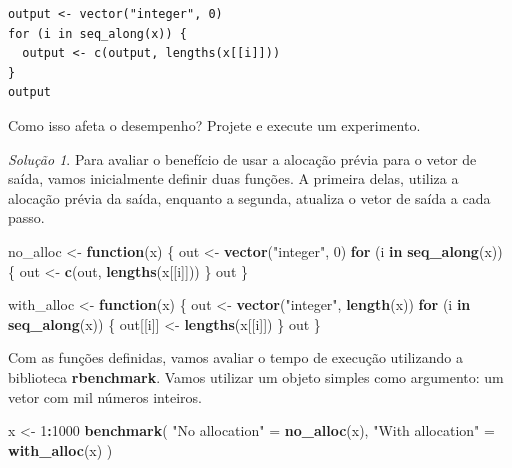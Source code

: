 \documentclass[
]{latex/krantz}
\newenvironment{Shaded}{\begin{snugshade}}{\end{snugshade}}
\newcommand{\ControlFlowTok}[1]{\textcolor[rgb]{0.13,0.29,0.53}{\textbf{#1}}}
\newcommand{\DecValTok}[1]{\textcolor[rgb]{0.00,0.00,0.81}{#1}}
\newcommand{\FunctionTok}[1]{\textcolor[rgb]{0.13,0.29,0.53}{\textbf{#1}}}
\newcommand{\NormalTok}[1]{#1}
\newcommand{\OtherTok}[1]{\textcolor[rgb]{0.56,0.35,0.01}{#1}}
\newcommand{\SpecialCharTok}[1]{\textcolor[rgb]{0.81,0.36,0.00}{\textbf{#1}}}
\newcommand{\StringTok}[1]{\textcolor[rgb]{0.31,0.60,0.02}{#1}}
\theoremstyle{definition}
\theoremstyle{definition}
\theoremstyle{definition}
\theoremstyle{definition}
\theoremstyle{remark}
\newtheorem*{solution}{Solução}
\begin{document}
\begin{verbatim}
output <- vector("integer", 0)
for (i in seq_along(x)) {
  output <- c(output, lengths(x[[i]]))
}
output
\end{verbatim}

Como isso afeta o desempenho? Projete e execute um experimento.

\begin{solution}
Para avaliar o benefício de usar a alocação prévia para o vetor de saída, vamos inicialmente definir duas funções. A primeira delas, utiliza a alocação prévia da saída, enquanto a segunda, atualiza o vetor de saída a cada passo.

\begin{Shaded}
\begin{Highlighting}[]
\NormalTok{no\_alloc }\OtherTok{\textless{}{-}} \ControlFlowTok{function}\NormalTok{(x) \{}
\NormalTok{  out }\OtherTok{\textless{}{-}} \FunctionTok{vector}\NormalTok{(}\StringTok{"integer"}\NormalTok{, }\DecValTok{0}\NormalTok{)}
  \ControlFlowTok{for}\NormalTok{ (i }\ControlFlowTok{in} \FunctionTok{seq\_along}\NormalTok{(x)) \{}
\NormalTok{    out }\OtherTok{\textless{}{-}} \FunctionTok{c}\NormalTok{(out, }\FunctionTok{lengths}\NormalTok{(x[[i]]))}
\NormalTok{  \}}
\NormalTok{  out}
\NormalTok{\}}

\NormalTok{with\_alloc }\OtherTok{\textless{}{-}} \ControlFlowTok{function}\NormalTok{(x) \{}
\NormalTok{  out }\OtherTok{\textless{}{-}} \FunctionTok{vector}\NormalTok{(}\StringTok{"integer"}\NormalTok{, }\FunctionTok{length}\NormalTok{(x))}
  \ControlFlowTok{for}\NormalTok{ (i }\ControlFlowTok{in} \FunctionTok{seq\_along}\NormalTok{(x)) \{}
\NormalTok{    out[[i]] }\OtherTok{\textless{}{-}} \FunctionTok{lengths}\NormalTok{(x[[i]])}
\NormalTok{  \}}
\NormalTok{  out}
\NormalTok{\}}
\end{Highlighting}
\end{Shaded}

Com as funções definidas, vamos avaliar o tempo de execução utilizando a biblioteca \textbf{rbenchmark}. Vamos utilizar um objeto simples como argumento: um vetor com mil números inteiros.

\begin{Shaded}
\begin{Highlighting}[]
\NormalTok{x }\OtherTok{\textless{}{-}} \DecValTok{1}\SpecialCharTok{:}\DecValTok{1000}
\FunctionTok{benchmark}\NormalTok{(}
  \StringTok{"No allocation"} \OtherTok{=} \FunctionTok{no\_alloc}\NormalTok{(x), }
  \StringTok{"With allocation"} \OtherTok{=} \FunctionTok{with\_alloc}\NormalTok{(x)}
\NormalTok{)}
\end{Highlighting}
\end{Shaded}


\end{solution}
\end{document}
